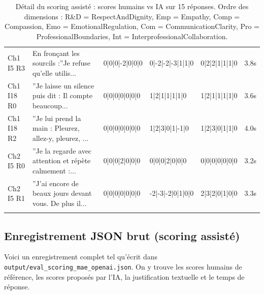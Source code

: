 \begin{longtable}{p{1.4cm} p{3.6cm} p{2.5cm} p{2.5cm} p{2.5cm} r}
Ch1 I5 R3 & \scriptsize{En fronçant les sourcils :''Je refuse qu'elle utilis...} & \scriptsize{0|0|0|-2|0|0|0} & \scriptsize{0|-2|-2|-3|1|1|0} & \scriptsize{0|2|2|1|1|1|0} & 3.8s \\
Ch1 I18 R0 & \scriptsize{''Je laisse un silence puis dit : Il compte beaucoup...} & \scriptsize{0|0|0|0|0|0|0} & \scriptsize{1|2|1|1|1|1|0} & \scriptsize{1|2|1|1|1|1|0} & 3.6s \\
Ch1 I18 R2 & \scriptsize{''Je lui prend la main : Pleurez, allez-y, pleurez, ...} & \scriptsize{0|0|0|0|0|0|0} & \scriptsize{1|2|3|0|1|-1|0} & \scriptsize{1|2|3|0|1|1|0} & 4.0s \\
Ch2 I5 R0 & \scriptsize{''Je la regarde avec attention et répète calmement :...} & \scriptsize{0|0|0|2|0|0|0} & \scriptsize{0|0|0|2|0|0|0} & \scriptsize{0|0|0|0|0|0|0} & 3.2s \\
Ch2 I5 R1 & \scriptsize{''J'ai encore de beaux jours devant vous. De plus il...} & \scriptsize{0|0|0|0|0|0|0} & \scriptsize{-2|-3|-2|0|1|0|0} & \scriptsize{2|3|2|0|1|0|0} & 3.3s \\
\bottomrule
\caption{D\'etail du scoring assist\'e : scores humains vs IA sur 15 r\'eponses. Ordre des dimensions : R\&D = RespectAndDignity, Emp = Empathy, Comp = Compassion, Emo = EmotionalRegulation, Com = CommunicationClarity, Pro = ProfessionalBoundaries, Int = InterprofessionalCollaboration.}
\end{longtable}


\subsection{Enregistrement JSON brut (scoring assist\'e)}

Voici un enregistrement complet tel qu'\'ecrit dans
\texttt{output/eval\_scoring\_mae\_openai.json}. On y trouve les scores humains
de r\'ef\'erence, les scores propos\'es par l'IA, la justification textuelle et
le temps de r\'eponse.


